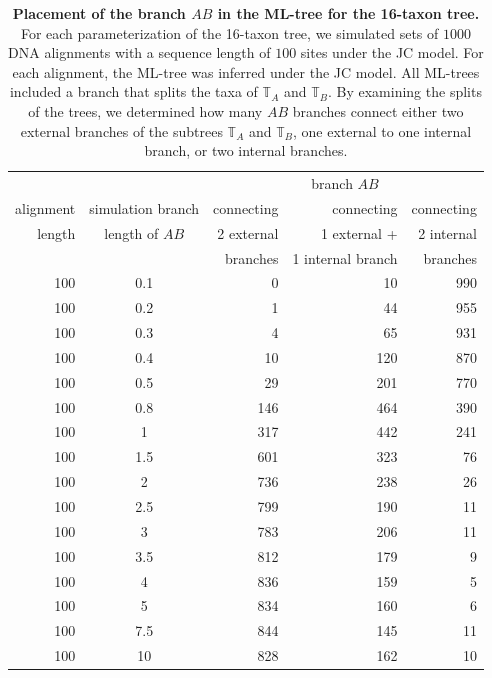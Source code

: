 \begin{appendices}
\begin{table}[hb]
    \centering
    \begin{tabular}{|r|c|r|r|r|}
\hline
 &  &\multicolumn{3}{c|}{branch $AB$}\\
alignment &simulation branch&   connecting  & connecting &  connecting\\
length &length of $AB$ &     2 external & 1 external +  & 2 internal \\
&&     branches & 1 internal branch & branches\\
\hline
100	&0.1	&  0	& 10 & 990 \\
100	&0.2	&  1	& 44 & 955 \\
100	&0.3	&  4	& 65 & 931 \\
100	&0.4	& 10	&120 & 870 \\
100	&0.5	& 29	&201 & 770 \\
100	&0.8	&146	&464 & 390 \\
100	&1   	&317	&442 & 241 \\
100	&1.5	&601	&323  & 76 \\
100	&2  	&736	&238  & 26 \\
100	&2.5	&799	&190 &  11 \\
100	&3  	&783	&206 &  11 \\
100	&3.5	&812	&179 &   9 \\
100	&4      &836	&159 &   5 \\
100	&5  	&834	&160 &   6 \\
100	&7.5	&844	&145 &  11 \\
100	&10 	&828	&162 &  10 \\
\hline
    \end{tabular}
    \vspace{0.25cm}
    \caption{
        \textbf{Placement of the  branch $AB$ in the ML-tree for the 16-taxon tree.}
        For each parameterization of the 16-taxon tree, we simulated sets of $1000$ DNA alignments with a sequence length of $100$ sites under the JC model. For each alignment, the ML-tree was inferred under the JC model. All ML-trees included a branch that splits the taxa of $\mathbb{T}_A$ and $\mathbb{T}_B$. By examining the splits of the trees, we determined how many $AB$ branches connect either two external branches of the subtrees $\mathbb{T}_A$ and $\mathbb{T}_B$, one external to one internal branch, or two internal branches.
   }
    \label{supptab:bonferroni_correction}
    \end{table}\hfill\\


\end{appendices}
